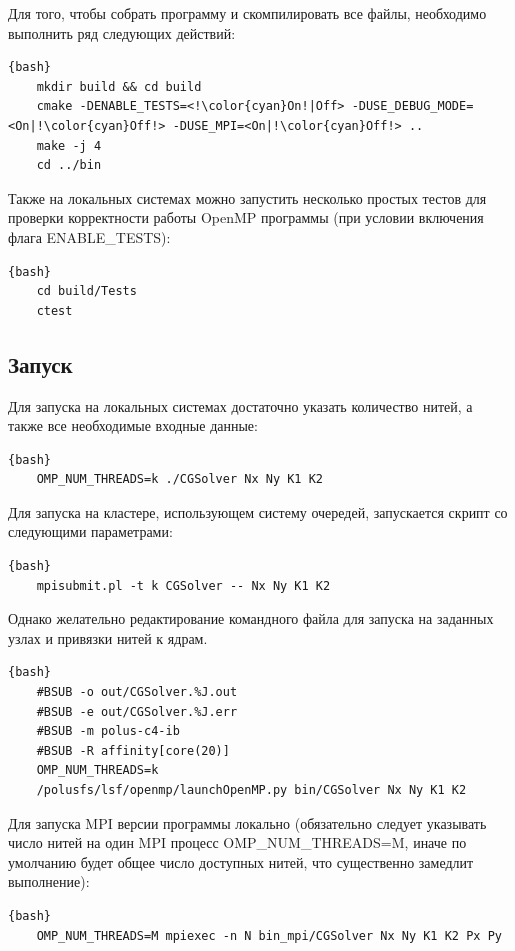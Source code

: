 \documentclass[12pt, a4paper]{article}
\begin{document}
Для того, чтобы собрать программу и скомпилировать все файлы, необходимо выполнить ряд следующих действий:

\begin{lstlisting}[escapechar=!]{bash}
	mkdir build && cd build
	cmake -DENABLE_TESTS=<!\color{cyan}On!|Off> -DUSE_DEBUG_MODE=<On|!\color{cyan}Off!> -DUSE_MPI=<On|!\color{cyan}Off!> ..
	make -j 4
	cd ../bin
\end{lstlisting}

Также на локальных системах можно запустить несколько простых тестов для проверки корректности работы OpenMP программы (при условии включения флага ENABLE\_TESTS):

\begin{lstlisting}{bash}
	cd build/Tests
	ctest
\end{lstlisting}

\subsection{Запуск}

Для запуска на локальных системах достаточно указать количество нитей, а также все необходимые входные данные:

\begin{lstlisting}{bash}
	OMP_NUM_THREADS=k ./CGSolver Nx Ny K1 K2
\end{lstlisting}

Для запуска на кластере, использующем систему очередей, запускается скрипт со следующими параметрами:

\begin{lstlisting}{bash}
	mpisubmit.pl -t k CGSolver -- Nx Ny K1 K2
\end{lstlisting}

Однако желательно редактирование командного файла для запуска на заданных узлах и привязки нитей к ядрам.

\begin{lstlisting}{bash}
	#BSUB -o out/CGSolver.%J.out
	#BSUB -e out/CGSolver.%J.err
	#BSUB -m polus-c4-ib
	#BSUB -R affinity[core(20)]
	OMP_NUM_THREADS=k
	/polusfs/lsf/openmp/launchOpenMP.py bin/CGSolver Nx Ny K1 K2
\end{lstlisting}

Для запуска MPI версии программы локально (обязательно следует указывать число нитей на один MPI процесс OMP\_NUM\_THREADS=M, иначе по умолчанию будет общее число доступных нитей, что существенно замедлит выполнение):

\begin{lstlisting}{bash}
	OMP_NUM_THREADS=M mpiexec -n N bin_mpi/CGSolver Nx Ny K1 K2 Px Py
\end{lstlisting}
\end{document}
